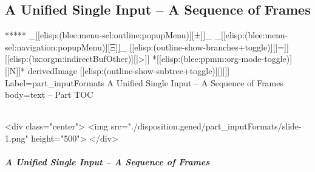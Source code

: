 \begin{whenOrg}
\newpage
\part{A Unified Single Input -- A Sequence of Frames}


\begin{whenOrg}
*****  _[[elisp:(blee:menu-sel:outline:popupMenu)][±]]_ _[[elisp:(blee:menu-sel:navigation:popupMenu)][Ξ]]_ [[elisp:(outline-show-branches+toggle)][|=]] [[elisp:(bx:orgm:indirectBufOther)][|>]] *[[elisp:(blee:ppmm:org-mode-toggle)][|N]]*  derivedImage [[elisp:(outline-show-subtree+toggle)][||]] Label=part_inputFormats A Unified Single Input -- A Sequence of Frames body=text -- Part TOC
\end{whenOrg}

\begin{htmlonly}

\begin{frame}[fragile,plain,label=part_inputFormats]
    \frametitle{}
    \framesubtitle{}
    \begin{rawhtml}
<div class="center">
<img src="./disposition.gened/part_inputFormats/slide-1.png" height="500">
</div>
    \end{rawhtml}
\end{frame}
\end{htmlonly}

\begin{verblatex}

\begin{frame}[fragile,label=part_inputFormats]
    \frametitle{A Unified Single Input -- A Sequence of Frames}
    \framesubtitle{}

    \tableofcontents


\end{frame}
\end{verblatex}




\end{whenOrg}
